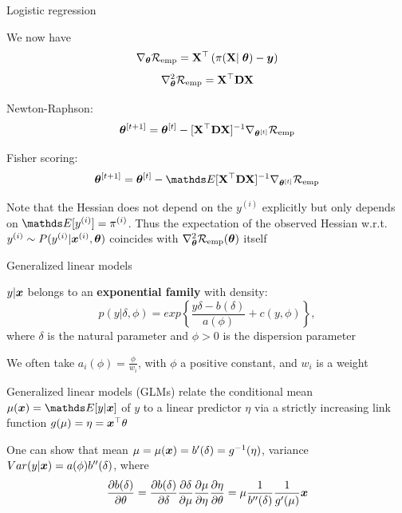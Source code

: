 \documentclass[11pt,compress,t,notes=noshow, xcolor=table]{beamer}
\begin{document}
\begin{framei}{Logistic regression}
\item We now have
$$\nabla_{\bm{\theta}}\mathcal{R}_{\text{emp}} =  \mathbf{X}^\top\left(\pi(\mathbf{X}\vert\;\bm{\theta}) - \bm{y}\right) $$
$$\nabla^2_{\bm{\theta}}\mathcal{R}_{\text{emp}} =  \mathbf{X}^\top \mathbf{D} \mathbf{X}$$
\vfill
\item Newton-Raphson: $$\bm{\theta}^{[t +1]}=\bm{\theta}^{[t]} - [\mathbf{X}^\top \mathbf{D} \mathbf{X}]^{-1}\nabla_{\bm{\theta}^{[t]}}\mathcal{R}_{\text{emp}} $$
\item Fisher scoring: $$\thetatn=\thetat - \E[\Xmat^\top \mathbf{D} \Xmat]^{-1}\nabla_{\thetat}\riske $$
\vfill
\item Note that the Hessian does not depend on the $y^{(i)}$ explicitly but only depends on $\E[y^{(i)}]=\pi^{(i)}$. Thus the expectation of the observed Hessian w.r.t. $y^{(i)}\sim P(y^{(i)}|\bm{x}^{(i)},\bm{\theta})$ coincides with $\nabla^2_{\bm{\theta}}\mathcal{R}_{\text{emp}}(\bm{\theta})$ itself
\end{framei}


\begin{framei}[fs=small]{Generalized linear models}
\item $y|\bm{x}$ belongs to an \textbf{exponential family} with density:
$$ p(y|\delta, \phi) = exp \left\{ \frac{y\delta-b(\delta)}{a(\phi)} + c(y,\phi) \right\}, $$
where $\delta$ is the natural parameter and $\phi > 0$ is the dispersion parameter
\item We often take $a_i(\phi) = \frac{\phi}{w_i}$, with $\phi$ a positive constant, and $w_i$ is a weight
\vfill
\item Generalized linear models (GLMs) relate the conditional mean $\mu(\xv)=\E[y|\xv]$ of $y$ to a linear predictor $\eta$ via a strictly increasing link function $g(\mu)=\eta=\bm{x}^\top\theta$
\vfill
\item One can show that mean $\mu = \mu(\bm{x})=b'(\delta)=g^{-1}(\eta)$, variance $Var(y|\bm{x})=a(\phi)b''(\delta)$, where
$$\frac{\partial{b(\delta)}}{\partial{\theta}}
=\frac{\partial{b(\delta)}}{\partial{\delta}}\frac{\partial{\delta}}{\partial{\mu}}\frac{\partial{\mu}}{\partial{\eta}}\frac{\partial{\eta}}{\partial{\theta}}
=\mu \frac{1}{b''(\delta)} \frac{1}{g'(\mu)} \bm{x}$$
\end{framei}
\end{document}
